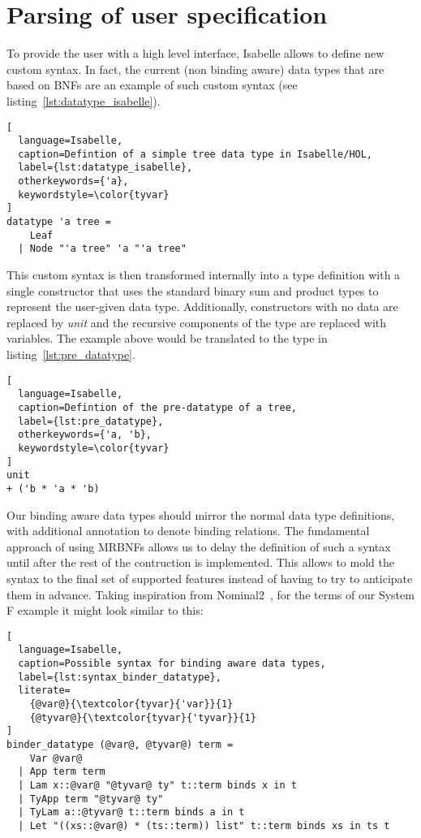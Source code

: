 \section{Parsing of user specification}

To provide the user with a high level interface, Isabelle allows to define new custom syntax. In fact, the current (non binding aware) data types that are based on \acp{BNF} are an example of such custom syntax (see listing~\ref{lst:datatype_isabelle}).

\begin{minipage}{\textwidth}
\begin{lstlisting}[
  language=Isabelle,
  caption=Defintion of a simple tree data type in Isabelle/HOL,
  label={lst:datatype_isabelle},
  otherkeywords={'a},
  keywordstyle=\color{tyvar}
]
datatype 'a tree =
    Leaf
  | Node "'a tree" 'a "'a tree"
\end{lstlisting}
\end{minipage}

This custom syntax is then transformed internally into a type definition with a single constructor that uses the standard binary sum and product types to represent the user-given data type. Additionally, constructors with no data are replaced by \textit{unit} and the recursive components of the type are replaced with variables. The example above would be translated to the type in listing~\ref{lst:pre_datatype}.

\begin{minipage}{\textwidth}
\begin{lstlisting}[
  language=Isabelle,
  caption=Defintion of the pre-datatype of a tree,
  label={lst:pre_datatype},
  otherkeywords={'a, 'b},
  keywordstyle=\color{tyvar}
]
unit
+ ('b * 'a * 'b)
\end{lstlisting}
\end{minipage}

Our binding aware data types should mirror the normal data type definitions, with additional annotation to denote binding relations. The fundamental approach of using \acp{MRBNF} allows us to delay the definition of such a syntax until after the rest of the contruction is implemented. This allows to mold the syntax to the final set of supported features instead of having to try to anticipate them in advance. Taking inspiration from Nominal2~\cite{nominal2}, for the terms of our System F example it might look similar to this:

\begin{lstlisting}[
  language=Isabelle,
  caption=Possible syntax for binding aware data types,
  label={lst:syntax_binder_datatype},
  literate=
    {@var@}{\textcolor{tyvar}{'var}}{1}
    {@tyvar@}{\textcolor{tyvar}{'tyvar}}{1}
]
binder_datatype (@var@, @tyvar@) term =
    Var @var@
  | App term term
  | Lam x::@var@ "@tyvar@ ty" t::term binds x in t
  | TyApp term "@tyvar@ ty"
  | TyLam a::@tyvar@ t::term binds a in t
  | Let "((xs::@var@) * (ts::term)) list" t::term binds xs in ts t
\end{lstlisting}

